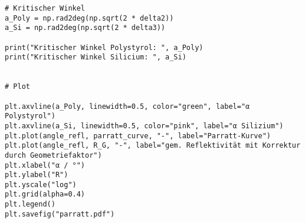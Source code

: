 \begin{lstlisting}
# Kritischer Winkel
a_Poly = np.rad2deg(np.sqrt(2 * delta2))
a_Si = np.rad2deg(np.sqrt(2 * delta3))

print("Kritischer Winkel Polystyrol: ", a_Poly)
print("Kritischer Winkel Silicium: ", a_Si)


# Plot

plt.axvline(a_Poly, linewidth=0.5, color="green", label="α Polystyrol")
plt.axvline(a_Si, linewidth=0.5, color="pink", label="α Silizium")
plt.plot(angle_refl, parratt_curve, "-", label="Parratt-Kurve")
plt.plot(angle_refl, R_G, "-", label="gem. Reflektivität mit Korrektur durch Geometriefaktor")
plt.xlabel("α / °")
plt.ylabel("R")
plt.yscale("log")
plt.grid(alpha=0.4)
plt.legend()
plt.savefig("parratt.pdf")
\end{lstlisting}
